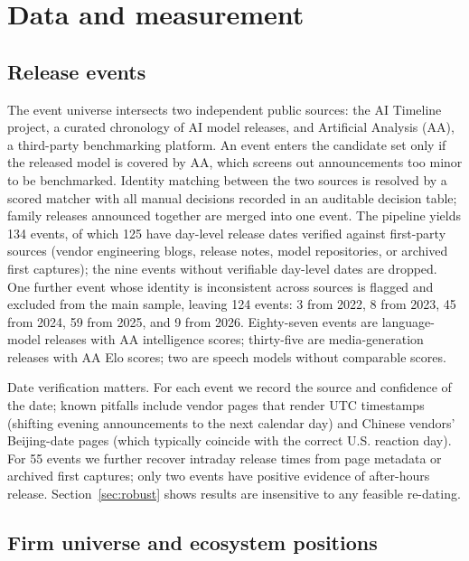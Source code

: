 \documentclass[review,12pt,authoryear]{elsarticle}
\begin{document}
\section{Data and measurement}\label{sec:data}

\subsection{Release events}\label{sec:events}

The event universe intersects two independent public sources: the AI Timeline
project, a curated chronology of AI model releases, and Artificial Analysis
(AA), a third-party benchmarking platform. An event enters the candidate set
only if the released model is covered by AA, which screens out announcements
too minor to be benchmarked. Identity matching between the two sources is
resolved by a scored matcher with all manual decisions recorded in an
auditable decision table; family releases announced together are merged into
one event. The pipeline yields 134 events, of which 125 have day-level release
dates verified against first-party sources (vendor engineering blogs, release
notes, model repositories, or archived first captures); the nine events
without verifiable day-level dates are dropped. One further event whose
identity is inconsistent across sources is flagged and excluded from the main
sample, leaving 124 events: 3 from 2022, 8 from 2023, 45 from 2024, 59 from
2025, and 9 from 2026. Eighty-seven events are language-model releases with AA
intelligence scores; thirty-five are media-generation releases with AA Elo
scores; two are speech models without comparable scores.

Date verification matters. For each event we record the source and confidence
of the date; known pitfalls include vendor pages that render UTC timestamps
(shifting evening announcements to the next calendar day) and Chinese vendors'
Beijing-date pages (which typically coincide with the correct U.S. reaction
day). For 55 events we further recover intraday release times from page
metadata or archived first captures; only two events have positive evidence of
after-hours release. Section~\ref{sec:robust} shows results are insensitive
to any feasible re-dating.

\subsection{Firm universe and ecosystem positions}\label{sec:positions}
\end{document}
